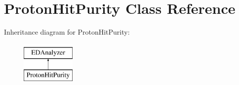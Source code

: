 \hypertarget{classProtonHitPurity}{}\section{Proton\+Hit\+Purity Class Reference}
\label{classProtonHitPurity}
Inheritance diagram for Proton\+Hit\+Purity\+:\begin{figure}[H]
\begin{center}
\leavevmode
\includegraphics[height=2.000000cm]{classProtonHitPurity}
\end{center}
\end{figure}
